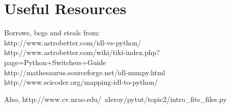 \documentclass[11pt,a4paper]{article}
\begin{document}
\section*{Useful Resources}
Borrows, begs and steals from: \\
http://www.astrobetter.com/idl-vs-python/ \\
http://www.astrobetter.com/wiki/tiki-index.php?page=Python+Switchers+Guide \\
http://mathesaurus.sourceforge.net/idl-numpy.html
http://www.scicoder.org/mapping-idl-to-python/

\noindent
Also, 
http://www.cv.nrao.edu/~aleroy/pytut/topic2/intro\_fits\_files.py

\noindent
\end{document}
